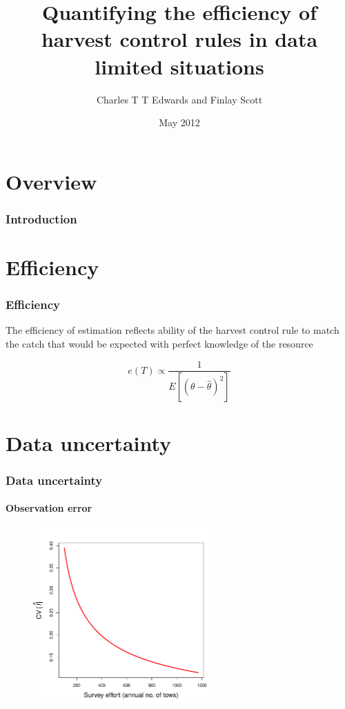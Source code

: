 \documentclass[pdf]{beamer}
\title[Control rule evaluation]{
Quantifying the efficiency of harvest control rules in data limited situations
	}
\subtitle{
	}
\author[CE \& FS]{
	Charles T T Edwards and Finlay Scott
	}
\institute[IC London]{
	Imperial College London
	}
\date{May 2012}
\begin{document}
\frame{\titlepage}

\section{Overview}
\begin{frame}
\frametitle{Introduction}


\end{frame}

\section{Efficiency}

\begin{frame}
\frametitle{Efficiency}
The efficiency of estimation reflects ability of the harvest control rule to match the catch that would be expected with perfect knowledge of the resource

\begin{equation}
e(T) \propto \frac{1}{E[(\theta - \hat{\theta})^2]} \nonumber
\end{equation}
\end{frame}

\section{Data uncertainty}

\begin{frame}
\frametitle{Data uncertainty}
\framesubtitle{Observation error}

\begin{figure}
\includegraphics[width=0.6\textwidth]{../dat/obserror.pdf}
\end{figure}

\end{frame}
\end{document}
